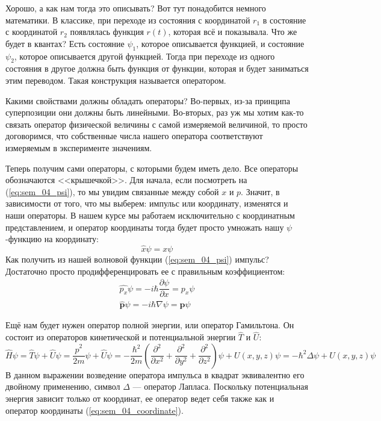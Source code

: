 \documentclass[12pt]{article}
\begin{document}
\vspace{1em} \noindent
Хорошо, а как нам тогда это описывать? Вот тут понадобится немного математики. В классике, при переходе из состояния с координатой $r_1$ в состояние с координатой $r_2$ появлялась функция $r(t)$, которая всё и показывала. Что же будет в квантах? Есть состояние $\psi_1$, которое описывается функцией, и состояние $\psi_2$, которое описывается другой функцией. Тогда при переходе из одного состояния в другое должна быть функция от функции, которая и будет заниматься этим переводом. Такая конструкция называется оператором.

\vspace{1em} \noindent
Какими свойствами должны обладать операторы? Во-первых, из-за принципа суперпозиции они должны быть линейными. Во-вторых, раз уж мы хотим как-то связать оператор физической величины с самой измеряемой величиной, то просто договоримся, что собственные числа нашего оператора соответствуют измеряемым в эксперименте значениям.

\vspace{1em} \noindent
Теперь получим сами операторы, с которыми будем иметь дело. Все операторы обозначаются <<крышечкой>>. Для начала, если посмотреть на (\ref{eq:sem_04_psi}), то мы увидим связанные между собой $x$ и $p$. Значит, в зависимости от того, что мы выберем: импульс или координату, изменятся и наши операторы. В нашем курсе мы работаем исключительно с координатным представлением, и оператор координаты тогда будет просто умножать нашу $\psi$-функцию на координату:
\begin{equation}
\label{eq:sem_04_coordinate}
    \hat{x}\psi = x\psi
\end{equation}
Как получить из нашей волновой функции (\ref{eq:sem_04_psi}) импульс? Достаточно просто продифференцировать ее с правильным коэффициентом:
\begin{gather}
\label{eq:sem_04_momentum}
    \hat{p_x}\psi = -i\hbar\dfrac{\partial\psi}{\partial x} = p_x \psi\\
    \hat{\textbf{p}}\psi = -i\hbar\nabla\psi = \textbf{p} \psi
\end{gather}

\noindent
Ещё нам будет нужен оператор полной энергии, или оператор Гамильтона. Он состоит из операторов кинетической и потенциальной энергии $\hat{T}$ и $\hat{U}$:
\begin{equation}
\label{eq:sem_04_hamilton}
    \hat{H}\psi = \hat{T}\psi + \hat{U}\psi = \dfrac{\hat{p}^2}{2m}\psi + \hat{U}\psi = -\dfrac{\hbar^2}{2m}\left(\dfrac{\partial^2}{\partial x^2} + \dfrac{\partial^2}{\partial y^2} + \dfrac{\partial^2}{\partial z^2}\right)\psi + U(x,y,z)\psi = -\hbar^2\Delta\psi + U(x,y,z)\psi
\end{equation}
В данном выражении возведение оператора импульса в квадрат эквивалентно его двойному применению, символ $\Delta$ --- оператор Лапласа. Поскольку потенциальная энергия зависит только от координат, ее оператор ведет себя также как и оператор координаты (\ref{eq:sem_04_coordinate}). 
\end{document}
